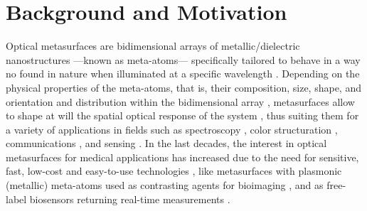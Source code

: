 
\chapter*{Background and Motivation}
\label{chapter:intro}



Optical metasurfaces are bidimensional arrays of metallic/dielectric nanostructures ---known as meta-atoms--- specifically tailored to behave in a way no found in nature when illuminated at a specific wavelength \cite{khan_optical_2022,gonzalez-alcalde_large_2020}. Depending on the physical properties of the meta-atoms, that is, their composition, size, shape, and orientation and distribution within the bidimensional array \cite{kim_plasmonic_2019,khan_optical_2022}, metasurfaces allow to shape at will the  spatial optical response of the system \cite{chen_review_2016}, thus suiting them for a variety of applications in fields such as spectroscopy \cite{khan_optical_2022}, color structuration \cite{gonzalez-alcalde_large_2020}, communications \cite{chen_review_2016}, and sensing \cite{estevez_trends_2014,jain_noble_2008,khan_optical_2022,chen_review_2016,kim_plasmonic_2019}. In the last decades, the interest in optical metasurfaces for medical applications has increased due to  the need for sensitive, fast, low-cost and easy-to-use technologies \cite{estevez_trends_2014,kim_plasmonic_2019}, like metasurfaces with plasmonic (metallic) meta-atoms used as contrasting agents for bioimaging  \cite{kim_plasmonic_2019}, and as free-label biosensors returning real-time measurements \cite{estevez_trends_2014,kabashin_plasmonic_2009,khan_optical_2022}.

